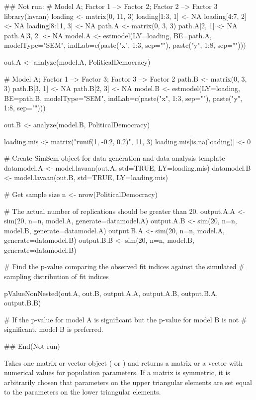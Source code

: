 \documentclass[a4paper]{book}
\begin{document}
\begin{Examples}
\begin{ExampleCode}
## Not run: 
# Model A; Factor 1 --> Factor 2; Factor 2 --> Factor 3
library(lavaan)
loading <- matrix(0, 11, 3)
loading[1:3, 1] <- NA
loading[4:7, 2] <- NA
loading[8:11, 3] <- NA
path.A <- matrix(0, 3, 3)
path.A[2, 1] <- NA
path.A[3, 2] <- NA
model.A <- estmodel(LY=loading, BE=path.A, modelType="SEM", indLab=c(paste("x", 1:3, sep=""), 
	paste("y", 1:8, sep="")))

out.A <- analyze(model.A, PoliticalDemocracy)

# Model A; Factor 1 --> Factor 3; Factor 3 --> Factor 2
path.B <- matrix(0, 3, 3)
path.B[3, 1] <- NA
path.B[2, 3] <- NA
model.B <- estmodel(LY=loading, BE=path.B, modelType="SEM", indLab=c(paste("x", 1:3, sep=""), 
	paste("y", 1:8, sep="")))

out.B <- analyze(model.B, PoliticalDemocracy)

loading.mis <- matrix("runif(1, -0.2, 0.2)", 11, 3)
loading.mis[is.na(loading)] <- 0

# Create SimSem object for data generation and data analysis template
datamodel.A <- model.lavaan(out.A, std=TRUE, LY=loading.mis)
datamodel.B <- model.lavaan(out.B, std=TRUE, LY=loading.mis)

# Get sample size
n <- nrow(PoliticalDemocracy)

# The actual number of replications should be greater than 20.
output.A.A <- sim(20, n=n, model.A, generate=datamodel.A) 
output.A.B <- sim(20, n=n, model.B, generate=datamodel.A)
output.B.A <- sim(20, n=n, model.A, generate=datamodel.B)
output.B.B <- sim(20, n=n, model.B, generate=datamodel.B)

# Find the p-value comparing the observed fit indices against the simulated 
# sampling distribution of fit indices

pValueNonNested(out.A, out.B, output.A.A, output.A.B, output.B.A, output.B.B)

# If the p-value for model A is significant but the p-value for model B is not
# significant, model B is preferred.

## End(Not run)
\end{ExampleCode}
\end{Examples}
%
\begin{Description}\relax
Takes one matrix or vector object ( or ) and returns a matrix or a vector with numerical values for population parameters. If a matrix is symmetric, it is arbitrarily chosen that parameters on the upper triangular elements are set equal to the parameters on the lower triangular elements.
\end{Description}
\end{document}
